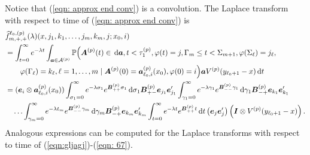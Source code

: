 Notice that (\ref{eqn: approx end conv}) is a convolution. The Laplace transform with respect to time of (\ref{eqn: approx end conv}) is
\begin{align}
	&\widehat f^{\ell_0,(p)}_{m,+,+}(\lambda)(x,j_1,k_1,\dots,j_m,k_m,j; x_0,i) \nonumber 
	\\&=\int_{t=0}^\infty e^{-\lambda t}\int_{\boldsymbol a \in\mathcal A^{(p)}}\mathbb P\Big(\boldsymbol A^{(p)}(t)\in \, \mathrm{d} \boldsymbol a, t<\tau_1^{(p)}, \varphi(t) = j, \Gamma_m\leq t<\Sigma_{m+1}, \nonumber
	\varphi(\Sigma_\ell) = j_\ell , 
	\\&\qquad\varphi(\Gamma_\ell) = k_\ell, \ell = 1,\dots,m \mid \boldsymbol A^{(p)}(0) = \boldsymbol   a_{\ell_0,i}^{(p)}(x_0), \varphi(0) = i\Big)\boldsymbol a V^{(p)}(y_{\ell_0+1}-x)\, \mathrm{d} t\nonumber
	\\&=(\boldsymbol e_i\otimes \boldsymbol  a_{\ell_0,i}^{(p)}(x_0))  \int_{\sigma_1=0}^\infty e^{-\lambda \sigma_1} e^{\boldsymbol{B}^{(p)}_{++}\sigma_1} \, \mathrm{d} \sigma_1 \boldsymbol{B}^{(p)}_{+{-}}\boldsymbol e_{j_1}\boldsymbol e_{j_1}'\nonumber
	\int_{\gamma_1=0}^\infty e^{-\lambda \gamma_1} e^{\boldsymbol{B}^{(p)}_{--}\gamma_1} \, \mathrm{d} \gamma_1\boldsymbol{B}^{(p)}_{-{+}}\boldsymbol e_{k_1}\boldsymbol e_{k_1}'
	\\&\quad\hdots 
	\int_{\gamma_m=0}^\infty e^{-\lambda t_m}e^{\boldsymbol{B}^{(p)}_{--}\gamma_m} \, \mathrm{d} \gamma_m\boldsymbol{B}^{(p)}_{-{+}}\boldsymbol e_{k_m}\boldsymbol e_{k_m}'
	\int_{t=0}^\infty e^{-\lambda t}e^{\boldsymbol{B}^{(p)}_{++}t} \, \mathrm{d} t 
	\left(\boldsymbol e_j\boldsymbol e_j' \right)\left(\boldsymbol I \otimes V^{(p)}(y_{\ell_0+1}-x)\right). \label{eqn: approx end conv lst}
\end{align}
Analogous expressions can be computed for the Laplace transforms with respect to time of (\ref{eqn:gljagj})-(\ref{eqn: 67}). 



